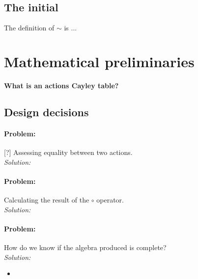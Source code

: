 \subsection{The initial}


The definition of $\sim$ is ...





\section{Mathematical preliminaries}


\paragraph{What is an actions Cayley table?}




\subsection{Design decisions}

\paragraph{Problem:}
[?] Assessing equality between two actions.
\\\textit{Solution:}


\paragraph{Problem:}
Calculating the result of the $\circ$ operator.
\\\textit{Solution:}




\paragraph{Problem:}
How do we know if the algebra produced is complete?
\\\textit{Solution:}
\begin{itemize}
    \item 
\end{itemize}



